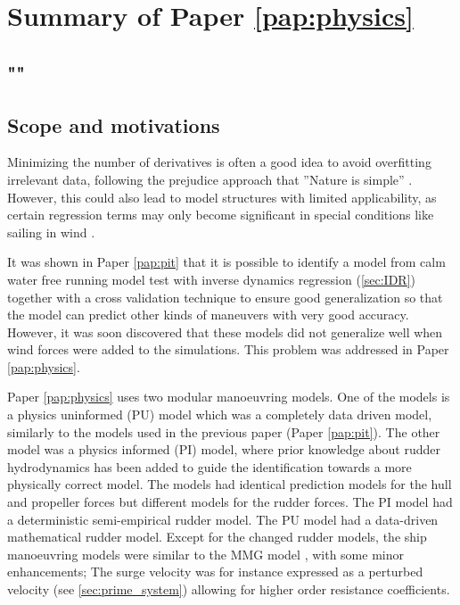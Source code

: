 \section{Summary of Paper \ref{pap:physics}}
\subsection*{""}
\subsection*{Scope and motivations}
Minimizing the number of derivatives is often a good idea to avoid overfitting irrelevant data, following the prejudice approach that ''Nature is simple'' \cite{ljungPerspectivesSystemIdentification2010}. However, this could also lead to model structures with limited applicability, as certain regression terms may only become significant in special conditions like sailing in wind \cite{abkowitzMEASUREMENTHYDRODYNAMICCHARACTERISTICS1980}.

It was shown in Paper \ref{pap:pit} that it is possible to identify a model from calm water free running model test with inverse dynamics regression (\autoref{sec:IDR}) together with a cross validation technique to ensure good generalization so that the model can predict other kinds of maneuvers with very good accuracy. However, it was soon discovered that these models did not generalize well when wind forces were added to the simulations. This problem was addressed in Paper \ref{pap:physics}.

Paper \ref{pap:physics} uses two modular manoeuvring models. One of the models is a physics uninformed (PU) model which was a completely data driven model, similarly to the models used in the previous paper (Paper \ref{pap:pit}).
The other model was a physics informed (PI) model, where prior knowledge about rudder hydrodynamics has been added to guide the identification towards a more physically correct model. 
The models had identical prediction models for the hull and propeller forces but different models for the rudder forces. The PI model had a deterministic semi-empirical rudder model. The PU model had a data-driven mathematical rudder model. Except for the changed rudder models, the ship manoeuvring models were similar to the MMG model \cite{yasukawaIntroductionMMGStandard2015}, with some minor enhancements; The surge velocity was for instance expressed as a perturbed velocity (see \autoref{sec:prime_system}) allowing for higher order resistance coefficients.

